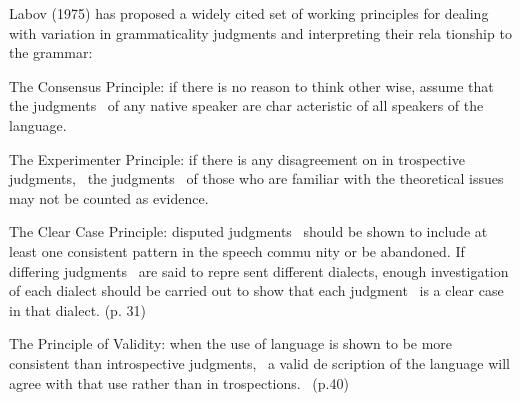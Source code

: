 \begin{styleStandard}
Labov (1975) has proposed a widely cited set of working principles for dealing with variation in grammaticality judgments and interpreting their rela\- tionship to the grammar:
\end{styleStandard}


\begin{listWWNumxvileveli}
\item 
\setcounter{listWWNumxvilevelii}{0}
\begin{listWWNumxvilevelii}
\item 
\begin{styleStandard}
The Consensus Principle: if there is no reason to think other\- wise, assume that the judgments \ of any native speaker are char\- acteristic of all speakers of the language.
\end{styleStandard}


\end{listWWNumxvilevelii}
\end{listWWNumxvileveli}
\setcounter{listWWNumxvleveli}{1}
\begin{listWWNumxvleveli}
\item 
\begin{styleStandard}
The Experimenter Principle: if there is any disagreement on in\- trospective judgments, \ the judgments \ of those who are familiar with the theoretical issues may not be counted as evidence.
\end{styleStandard}


\item 
\begin{styleStandard}
The Clear Case Principle: disputed judgments \ should be shown to include at least one consistent pattern in the speech commu\- nity or be abandoned. If differing judgments \ are said to repre\- sent different dialects, enough investigation of each dialect should be carried out to show that each judgment \ is a clear case in that dialect. (p. 31)
\end{styleStandard}


\item 
\begin{styleStandard}
The Principle of Validity: when the use of language is shown to be more consistent than introspective judgments, \ a valid de\- scription of the language will agree with that use rather than in\- trospections. \ (p.40)
\end{styleStandard}


\end{listWWNumxvleveli}
